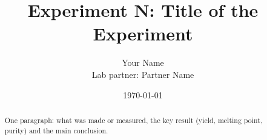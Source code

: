 \documentclass[11pt]{article}
\title{Experiment N: Title of the Experiment}
\author{Your Name \\ \small Lab partner: Partner Name}
\date{\today}
\begin{document}
\maketitle

\begin{abstract}
One paragraph: what was made or measured, the key result (yield, melting point,
purity) and the main conclusion.
\end{abstract}








\end{document}
